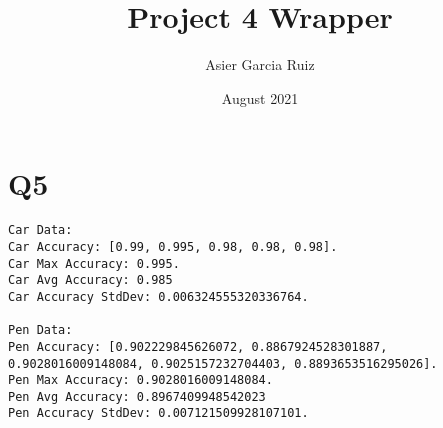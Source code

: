 \documentclass{article}
\title{Project 4 Wrapper}
\author{Asier Garcia Ruiz }
\date{August 2021}
\begin{document}
\maketitle

\section*{Q5}
\begin{lstlisting}
Car Data:
Car Accuracy: [0.99, 0.995, 0.98, 0.98, 0.98].
Car Max Accuracy: 0.995.
Car Avg Accuracy: 0.985
Car Accuracy StdDev: 0.006324555320336764.

Pen Data:
Pen Accuracy: [0.902229845626072, 0.8867924528301887,
0.9028016009148084, 0.9025157232704403, 0.8893653516295026].
Pen Max Accuracy: 0.9028016009148084.
Pen Avg Accuracy: 0.8967409948542023
Pen Accuracy StdDev: 0.007121509928107101.
\end{lstlisting}
\end{document}
